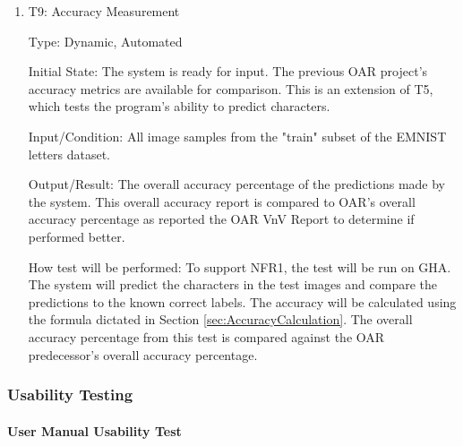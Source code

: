 \documentclass[12pt, titlepage]{article}
\begin{document}
\begin{enumerate}

\item{T9: Accuracy Measurement\\}

Type: Dynamic, Automated

Initial State: The \progname{} system is ready for input. The previous
OAR project's accuracy metrics are available for comparison. This is an
extension of T5, which tests the program's ability to predict characters.

Input/Condition: All image samples from the "train" subset of the EMNIST letters
dataset.

Output/Result: The overall accuracy percentage of the predictions made by the
\progname{} system. This overall accuracy report is compared to OAR's overall
accuracy percentage as reported the OAR VnV Report to determine if \progname{}
performed better.

How test will be performed: To support NFR1, the test will be run on GHA. The
system will predict the characters in the test images and compare the
predictions to the known correct labels. The accuracy will be calculated using
the formula dictated in Section \ref{sec:AccuracyCalculation}. The overall
accuracy percentage from this test is compared against the OAR predecessor's
overall accuracy percentage.

\end{enumerate}

\subsubsection{Usability Testing}

\paragraph{User Manual Usability Test}
\end{document}
